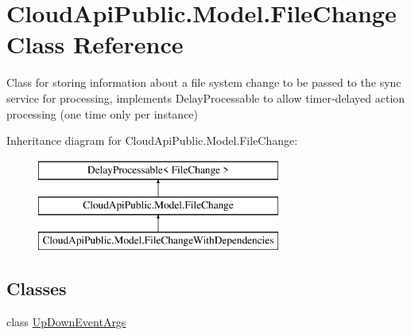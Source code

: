 \hypertarget{class_cloud_api_public_1_1_model_1_1_file_change}{\section{Cloud\-Api\-Public.\-Model.\-File\-Change Class Reference}
\label{class_cloud_api_public_1_1_model_1_1_file_change}
}


Class for storing information about a file system change to be passed to the sync service for processing, implements Delay\-Processable to allow timer-\/delayed action processing (one time only per instance)  


Inheritance diagram for Cloud\-Api\-Public.\-Model.\-File\-Change\-:\begin{figure}[H]
\begin{center}
\leavevmode
\includegraphics[height=3.000000cm]{class_cloud_api_public_1_1_model_1_1_file_change}
\end{center}
\end{figure}
\subsection*{Classes}
\begin{DoxyCompactItemize}
\item 
class \hyperlink{class_cloud_api_public_1_1_model_1_1_file_change_1_1_up_down_event_args}{Up\-Down\-Event\-Args}
\end{DoxyCompactItemize}
